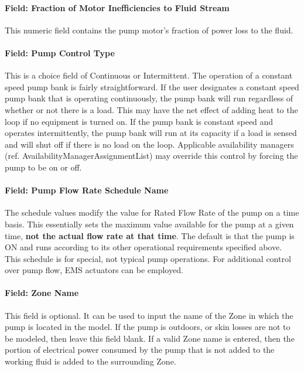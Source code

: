 \paragraph{Field: Fraction of Motor Inefficiencies to Fluid Stream}\label{field-fraction-of-motor-inefficiencies-to-fluid-stream-3}

This numeric field contains the pump motor's fraction of power loss to the fluid.

\paragraph{Field: Pump Control Type}\label{field-pump-control-type-2-000}

This is a choice field of Continuous or Intermittent. The operation of a constant speed pump bank is fairly straightforward. If the user designates a constant speed pump bank that is operating continuously, the pump bank will run regardless of whether or not there is a load. This may have the net effect of adding heat to the loop if no equipment is turned on. If the pump bank is constant speed and operates intermittently, the pump bank will run at its capacity if a load is sensed and will shut off if there is no load on the loop. Applicable availability managers (ref. AvailabilityManagerAssignmentList) may override this control by forcing the pump to be on or off.

\paragraph{Field: Pump Flow Rate Schedule Name}\label{field-pump-flow-rate-schedule-name-3}

The schedule values modify the value for Rated Flow Rate of the pump on a time basis. This essentially sets the maximum value available for the pump at a given time, \textbf{not the actual flow rate at that time}. The default is that the pump is ON and runs according to its other operational requirements specified above. This schedule is for special, not typical pump operations. For additional control over pump flow, EMS actuators can be employed.

\paragraph{Field: Zone Name}\label{field-zone-name-3-003}

This field is optional. It can be used to input the name of the Zone in which the pump is located in the model. If the pump is outdoors, or skin losses are not to be modeled, then leave this field blank. If a valid Zone name is entered, then the portion of electrical power consumed by the pump that is not added to the working fluid is added to the surrounding Zone.

